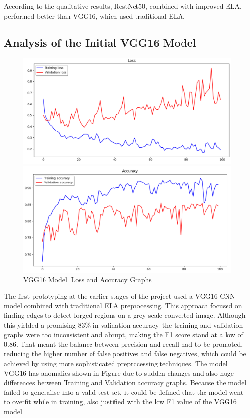 \documentclass{ieeeaccess}
\begin{document}
  
  According to the qualitative results, RestNet50, combined with improved ELA, performed better than VGG16, which used traditional ELA.
  
\subsection{Analysis of the Initial VGG16 Model}
    \begin{figure}[h!]
  	\centering
  	\begin{minipage}{0.45\textwidth}
  		\centering
  		\includegraphics[width=\linewidth]{LOSS_VGG16.png}
  	\end{minipage}
  	\hfill
  	\begin{minipage}{0.45\textwidth}
  		\centering
  		\includegraphics[width=\linewidth]{VGG16_ACC.png}
  	\end{minipage}
  	\caption{VGG16 Model: Loss and Accuracy Graphs}
  	\label{fig:vgg16-graphs}
  \end{figure}
  
  The first prototyping at the earlier stages of the project used a VGG16 CNN model combined with traditional ELA preprocessing. This approach focused on finding edges to detect forged regions on a grey-scale-converted image. Although this yielded a promising 83\% in validation accuracy, the training and validation graphs were too inconsistent and abrupt, making the F1 score stand at a low of 0.86. That meant the balance between precision and recall had to be promoted, reducing the higher number of false positives and false negatives, which could be achieved by using more sophisticated preprocessing techniques. The model VGG16 has anomalies shown in Figure  due to sudden changes and also huge differences between Training and Validation accuracy graphs. Because the model failed to generalise into a valid test set, it could be defined that the model went to overfit while in training, also justified with the low F1 value of the VGG16 model
  
\end{document}
